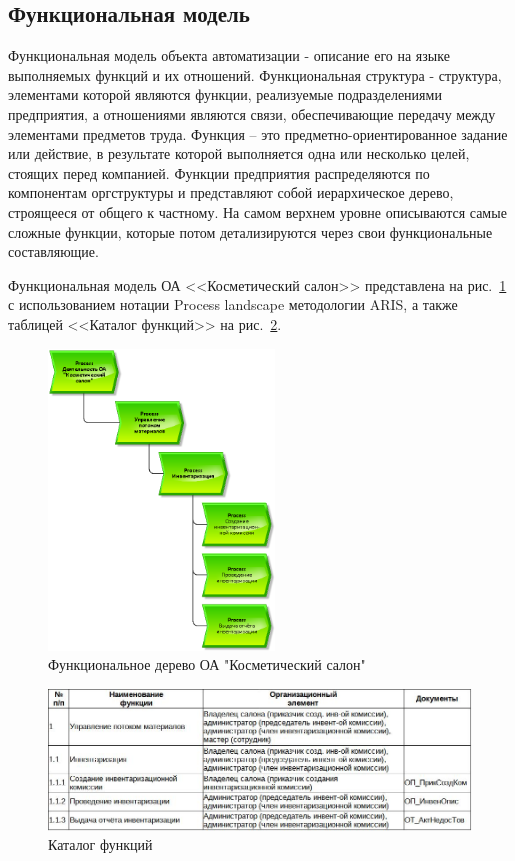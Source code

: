 \newpage
\subsection{Функциональная модель}

Функциональная модель объекта автоматизации - описание его на языке выполняемых функций и их отношений.
Функциональная структура - структура, элементами которой являются функции,
реализуемые подразделениями предприятия, а отношениями являются связи,
обеспечивающие передачу между элементами предметов труда.
Функция – это предметно-ориентированное задание или действие,
в результате которой выполняется одна или несколько целей, стоящих перед компанией.
Функции предприятия распределяются по компонентам оргструктуры и представляют собой иерархическое дерево,
строящееся от общего к частному.
На самом верхнем уровне описываются самые сложные функции,
которые потом детализируются через свои функциональные составляющие.

Функциональная модель ОА <<Косметический салон>> представлена
на рис.~\ref{fig:FynctionalnayModel}
с использованием нотации Process landscape методологии ARIS,
а также таблицей <<Каталог функций>>
на рис.~\ref{fig:Fynctii_katalog}.

\begin{figure}[!h]
    \centering
    \includegraphics[height=8cm]
        {_docs/ФункциональнаяМодель.png}
    \caption{Функциональное дерево ОА "Косметический салон"}
    \label{fig:FynctionalnayModel}
\end{figure}

\begin{figure}[!h]
    \centering
    \includegraphics[width=12cm]
        {_docs/Функции_каталог.jpg}
    \caption{Каталог функций}
    \label{fig:Fynctii_katalog}
\end{figure}

